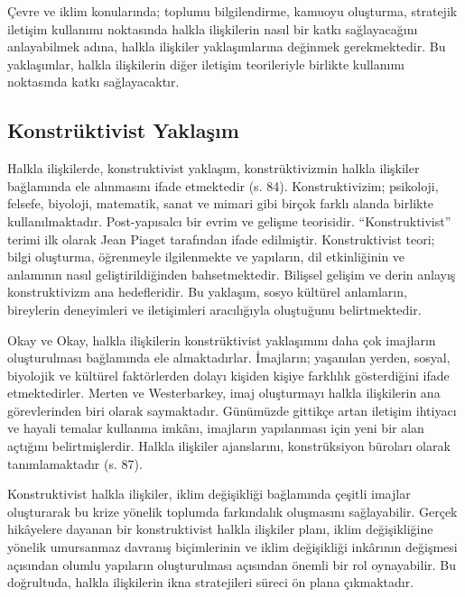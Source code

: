 \documentclass[
]{book}
\begin{document}
Çevre ve iklim konularında; toplumu bilgilendirme, kamuoyu oluşturma, stratejik iletişim kullanımı noktasında halkla ilişkilerin nasıl bir katkı sağlayacağını anlayabilmek adına, halkla ilişkiler yaklaşımlarına değinmek gerekmektedir. Bu yaklaşımlar, halkla ilişkilerin diğer iletişim teorileriyle birlikte kullanımı noktasında katkı sağlayacaktır.

\hypertarget{konstruxfcktivist-yaklaux15fux131m}{%
\subsection{Konstrüktivist Yaklaşım}\label{konstruxfcktivist-yaklaux15fux131m}}

Halkla ilişkilerde, konstruktivist yaklaşım, konstrüktivizmin halkla ilişkiler bağlamında ele alınmasını ifade etmektedir (s. 84). \citep{ayla2002halkla} Konstruktivizim; psikoloji, felsefe, biyoloji, matematik, sanat ve mimari gibi birçok farklı alanda birlikte kullanılmaktadır. \citep{harlow2006karl} Post-yapısalcı bir evrim ve gelişme teorisidir. ``Konstruktivist'' terimi ilk olarak Jean Piaget tarafından ifade edilmiştir. Konstruktivist teori; bilgi oluşturma, öğrenmeyle ilgilenmekte ve yapıların, dil etkinliğinin ve anlamının nasıl geliştirildiğinden bahsetmektedir. Bilişsel gelişim ve derin anlayış konstruktivizm ana hedefleridir. \citep{communicationtheory_constructivism} Bu yaklaşım, sosyo kültürel anlamların, bireylerin deneyimleri ve iletişimleri aracılığıyla oluştuğunu belirtmektedir. \citep{langer1999towards}

Okay ve Okay, halkla ilişkilerin konstrüktivist yaklaşımını daha çok imajların oluşturulması bağlamında ele almaktadırlar. İmajların; yaşanılan yerden, sosyal, biyolojik ve kültürel faktörlerden dolayı kişiden kişiye farklılık gösterdiğini ifade etmektedirler. Merten ve Westerbarkey, imaj oluşturmayı halkla ilişkilerin ana görevlerinden biri olarak saymaktadır. Günümüzde gittikçe artan iletişim ihtiyacı ve hayali temalar kullanma imkânı, imajların yapılanması için yeni bir alan açtığını belirtmişlerdir. Halkla ilişkiler ajanslarını, konstrüksiyon büroları olarak tanımlamaktadır (s. 87). \citep{ayla2002halkla}

Konstruktivist halkla ilişkiler, iklim değişikliği bağlamında çeşitli imajlar oluşturarak bu krize yönelik toplumda farkındalık oluşmasını sağlayabilir. Gerçek hikâyelere dayanan bir konstruktivist halkla ilişkiler planı, iklim değişikliğine yönelik umursanmaz davranış biçimlerinin ve iklim değişikliği inkârının değişmesi açısından olumlu yapıların oluşturulması açısından önemli bir rol oynayabilir. Bu doğrultuda, halkla ilişkilerin ikna stratejileri süreci ön plana çıkmaktadır.
\end{document}
